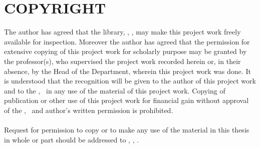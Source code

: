 \section*{COPYRIGHT}

The author has agreed that the library, \thedepartment, \thecampus, may make this project
work freely available for inspection. Moreover the author has agreed that the
permission for extensive copying of this project work for scholarly purpose may be
granted by the professor(s), who supervised the project work recorded herein or, in
their absence, by the Head of the Department, wherein this project work was done. It
is understood that the recognition will be given to the author of this project work and
to the \thedepartment, \thecampus \ in any use of the material of this project work. Copying of publication or other use of
this project work for financial gain without approval of the \thedepartment, \thecampus \ and author's
written permission is prohibited.\\
\\
Request for permission to copy or to make any use of the material in this thesis in
whole or part should be addressed to \thedepartment, \thecampus, \thedepartmentFullAddress.

